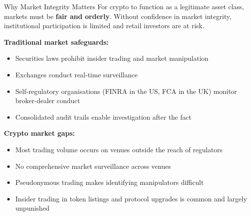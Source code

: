 \documentclass[10pt]{beamer}
\newcommand{\highlight}[1]{\textcolor{AccentOrange}{\textbf{#1}}}
\begin{document}
\begin{frame}{Why Market Integrity Matters}
  For crypto to function as a legitimate asset class, markets must be \highlight{fair and orderly}. Without confidence in market integrity, institutional participation is limited and retail investors are at risk.
  
  \vspace{0.5em}
  \textbf{Traditional market safeguards:}
  \begin{itemize}
    \item Securities laws prohibit insider trading and market manipulation
    \item Exchanges conduct real-time surveillance
    \item Self-regulatory organisations (FINRA in the US, FCA in the UK) monitor broker-dealer conduct
    \item Consolidated audit trails enable investigation after the fact
  \end{itemize}
  
  \vspace{0.5em}
  \textbf{Crypto market gaps:}
  \begin{itemize}
    \item Most trading volume occurs on venues outside the reach of regulators
    \item No comprehensive market surveillance across venues
    \item Pseudonymous trading makes identifying manipulators difficult
    \item Insider trading in token listings and protocol upgrades is common and largely unpunished
  \end{itemize}
\end{frame}
\end{document}
